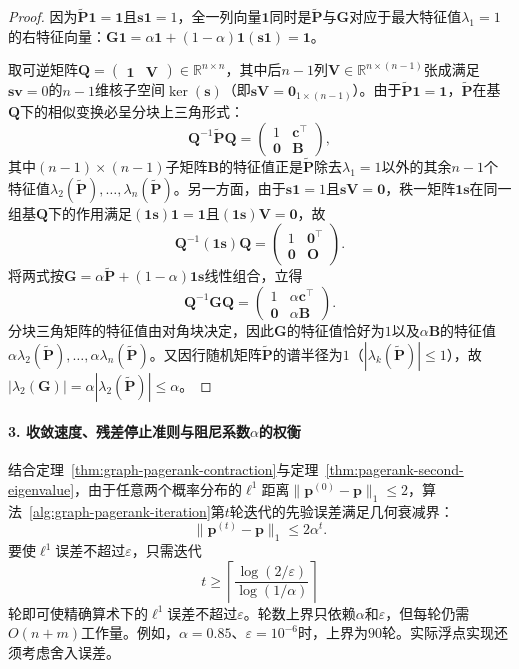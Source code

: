 \begin{proof}
因为$\widetilde{\bm P}\bm 1=\bm 1$且$\bm s\bm 1=1$，全一列向量$\bm 1$同时是$\widetilde{\bm P}$与$\bm G$对应于最大特征值$\lambda_1=1$的右特征向量：$\bm G\bm 1=\alpha\bm 1+(1-\alpha)\bm 1(\bm s\bm 1)=\bm 1$。

取可逆矩阵$\bm Q=\begin{pmatrix}\bm 1 & \bm V\end{pmatrix}\in\mathbb R^{n\times n}$，其中后$n-1$列$\bm V\in\mathbb R^{n\times(n-1)}$张成满足$\bm s\bm v=0$的$n-1$维核子空间$\ker(\bm s)$（即$\bm s\bm V=\bm 0_{1\times(n-1)}$）。由于$\widetilde{\bm P}\bm 1=\bm 1$，$\widetilde{\bm P}$在基$\bm Q$下的相似变换必呈分块上三角形式：
\[
  \bm Q^{-1}\widetilde{\bm P}\bm Q = \begin{pmatrix} 1 & \bm c^\top \\ \bm 0 & \bm B \end{pmatrix},
\]
其中$(n-1)\times(n-1)$子矩阵$\bm B$的特征值正是$\widetilde{\bm P}$除去$\lambda_1=1$以外的其余$n-1$个特征值$\lambda_2(\widetilde{\bm P}),\ldots,\lambda_n(\widetilde{\bm P})$。另一方面，由于$\bm s\bm 1=1$且$\bm s\bm V=\bm 0$，秩一矩阵$\bm 1\bm s$在同一组基$\bm Q$下的作用满足$(\bm 1\bm s)\bm 1=\bm 1$且$(\bm 1\bm s)\bm V=\bm 0$，故
\[
  \bm Q^{-1}(\bm 1\bm s)\bm Q = \begin{pmatrix} 1 & \bm 0^\top \\ \bm 0 & \bm O \end{pmatrix}.
\]
将两式按$\bm G=\alpha\widetilde{\bm P}+(1-\alpha)\bm 1\bm s$线性组合，立得
\[
  \bm Q^{-1}\bm G\bm Q = \begin{pmatrix} 1 & \alpha\bm c^\top \\ \bm 0 & \alpha\bm B \end{pmatrix}.
\]
分块三角矩阵的特征值由对角块决定，因此$\bm G$的特征值恰好为$1$以及$\alpha\bm B$的特征值$\alpha\lambda_2(\widetilde{\bm P}),\ldots,\alpha\lambda_n(\widetilde{\bm P})$。又因行随机矩阵$\widetilde{\bm P}$的谱半径为$1$（$|\lambda_k(\widetilde{\bm P})|\leq 1$），故$|\lambda_2(\bm G)|=\alpha|\lambda_2(\widetilde{\bm P})|\leq\alpha$。
\end{proof}

\paragraph{3. 收敛速度、残差停止准则与阻尼系数$\alpha$的权衡}

结合定理~\ref{thm:graph-pagerank-contraction}与定理~\ref{thm:pagerank-second-eigenvalue}，由于任意两个概率分布的$\ell^1$距离$\lVert\bm p^{(0)}-\bm p\rVert_1\leq 2$，算法~\ref{alg:graph-pagerank-iteration}第$t$轮迭代的先验误差满足几何衰减界：
\begin{equation}
\lVert\bm{p}^{(t)}-\bm{p}\rVert_1\le 2\alpha^t.
\label{eq:graph-pagerank-geometric-bound}
\end{equation}
要使$\ell^1$误差不超过$\varepsilon$，只需迭代
\[
t\ge \left\lceil\frac{\log(2/\varepsilon)}{\log(1/\alpha)}\right\rceil
\]
轮即可使精确算术下的$\ell^1$误差不超过$\varepsilon$。轮数上界只依赖$\alpha$和$\varepsilon$，但每轮仍需$O(n+m)$工作量。例如，$\alpha=0.85$、$\varepsilon=10^{-6}$时，上界为$90$轮。实际浮点实现还须考虑舍入误差。

